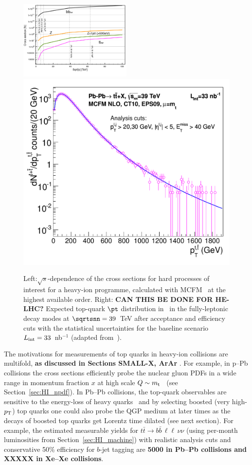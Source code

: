 \documentclass[../report.tex]{subfiles}
\begin{document}
\begin{figure}[!h]
\begin{center}
\includegraphics[width=0.5\textwidth]{helhc/figs/HardCS-HICFCC.pdf}
\hfill
\includegraphics[width=0.4\columnwidth]{helhc/figs/cPtReach_39000GeV.pdf}
\caption{Left:$\sqrt s$-dependence of the cross sections for hard processes of
  interest for a heavy-ion programme, calculated with MCFM~\cite{Campbell:2010ff}
at the highest available order. 
  Right: {\bf CAN THIS BE DONE FOR HE-LHC?} Expected top-quark $\pt$ distribution in \PbPb\ in the
  fully-leptonic decay modes at $\sqrtsnn=39$~TeV after acceptance and
  efficiency cuts with the statistical uncertainties
  for the baseline scenario $L_{\rm int}=33$~nb$^{-1}$ (adapted from~\cite{dEnterria:2015mgr}).}
\label{fig:hardXsectHIC}
\end{center}
\end{figure}





The motivations for measurements of top quarks in heavy-ion collisions
are multifold, {\bf as discussed in Sections SMALL-X, ArAr} . For example, in
p--Pb collisions the cross sections efficiently probe the nuclear
gluon PDFs in a wide range in momentum fraction
$x$ at high scale $Q\sim m_{\rm t}$~\cite{dEnterria:2015mgr} (see Section~\ref{sec:HI_npdf}). In Pb--Pb
collisions, the top-quark observables are sensitive to the energy-loss of heavy quarks~\cite{Baskakov:2015nxa}
and by selecting boosted (very high-$p_{\rm T}$) top quarks one could also probe the QGP medium at later times as the decays of boosted top quarks get Lorentz
time dilated (see next section). 
For example, the estimated measurable yields  for $t\bar t\to b\bar b\,\ell\ell\,\nu\nu$ (using
 per-month luminosities from Section~\ref{sec:HI_machine}) with
realistic analysis cuts 
and conservative 50\% efficiency for $b$-jet tagging are
{\bf 5000 in Pb--Pb collisions and XXXXX in Xe--Xe collisions}.
\end{document}
